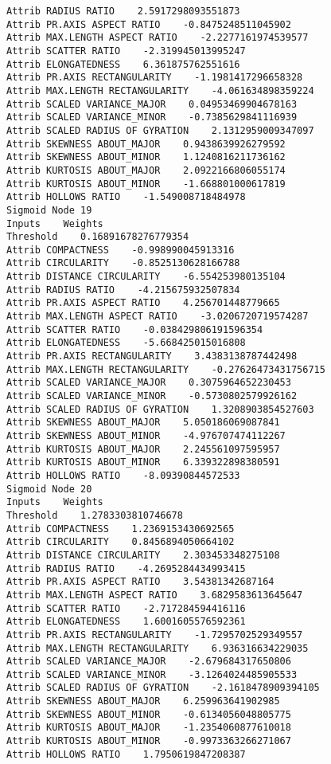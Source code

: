 \documentclass[
	article,			%
	11pt,				%
	oneside,			%
	a4paper,			%
	english,			%
	brazil,				%
	sumario=tradicional
	]{abntex2}
\begin{document}
\begin{lstlisting}
Attrib RADIUS RATIO    2.5917298093551873
Attrib PR.AXIS ASPECT RATIO    -0.8475248511045902
Attrib MAX.LENGTH ASPECT RATIO    -2.2277161974539577
Attrib SCATTER RATIO    -2.319945013995247
Attrib ELONGATEDNESS    6.361875762551616
Attrib PR.AXIS RECTANGULARITY    -1.1981417296658328
Attrib MAX.LENGTH RECTANGULARITY    -4.061634898359224
Attrib SCALED VARIANCE_MAJOR    0.04953469904678163
Attrib SCALED VARIANCE_MINOR    -0.7385629841116939
Attrib SCALED RADIUS OF GYRATION    2.1312959009347097
Attrib SKEWNESS ABOUT_MAJOR    0.9438639926279592
Attrib SKEWNESS ABOUT_MINOR    1.1240816211736162
Attrib KURTOSIS ABOUT_MAJOR    2.0922166806055174
Attrib KURTOSIS ABOUT_MINOR    -1.668801000617819
Attrib HOLLOWS RATIO    -1.549008718484978
Sigmoid Node 19
Inputs    Weights
Threshold    0.16891678276779354
Attrib COMPACTNESS    -0.998990045913316
Attrib CIRCULARITY    -0.8525130628166788
Attrib DISTANCE CIRCULARITY    -6.554253980135104
Attrib RADIUS RATIO    -4.215675932507834
Attrib PR.AXIS ASPECT RATIO    4.256701448779665
Attrib MAX.LENGTH ASPECT RATIO    -3.0206720719574287
Attrib SCATTER RATIO    -0.038429806191596354
Attrib ELONGATEDNESS    -5.668425015016808
Attrib PR.AXIS RECTANGULARITY    3.4383138787442498
Attrib MAX.LENGTH RECTANGULARITY    -0.27626473431756715
Attrib SCALED VARIANCE_MAJOR    0.3075964652230453
Attrib SCALED VARIANCE_MINOR    -0.5730802579926162
Attrib SCALED RADIUS OF GYRATION    1.3208903854527603
Attrib SKEWNESS ABOUT_MAJOR    5.050186069087841
Attrib SKEWNESS ABOUT_MINOR    -4.976707474112267
Attrib KURTOSIS ABOUT_MAJOR    2.245561097595957
Attrib KURTOSIS ABOUT_MINOR    6.339322898380591
Attrib HOLLOWS RATIO    -8.09390844572533
Sigmoid Node 20
Inputs    Weights
Threshold    1.2783303810746678
Attrib COMPACTNESS    1.2369153430692565
Attrib CIRCULARITY    0.8456894050664102
Attrib DISTANCE CIRCULARITY    2.303453348275108
Attrib RADIUS RATIO    -4.2695284434993415
Attrib PR.AXIS ASPECT RATIO    3.54381342687164
Attrib MAX.LENGTH ASPECT RATIO    3.6829583613645647
Attrib SCATTER RATIO    -2.717284594416116
Attrib ELONGATEDNESS    1.6001605576592361
Attrib PR.AXIS RECTANGULARITY    -1.7295702529349557
Attrib MAX.LENGTH RECTANGULARITY    6.936316634229035
Attrib SCALED VARIANCE_MAJOR    -2.679684317650806
Attrib SCALED VARIANCE_MINOR    -3.1264024485905533
Attrib SCALED RADIUS OF GYRATION    -2.1618478909394105
Attrib SKEWNESS ABOUT_MAJOR    6.259963641902985
Attrib SKEWNESS ABOUT_MINOR    -0.6134056048805775
Attrib KURTOSIS ABOUT_MAJOR    -1.2354060877610018
Attrib KURTOSIS ABOUT_MINOR    -0.9973363266271067
Attrib HOLLOWS RATIO    1.7950619847208387

\end{lstlisting}
\end{document}
